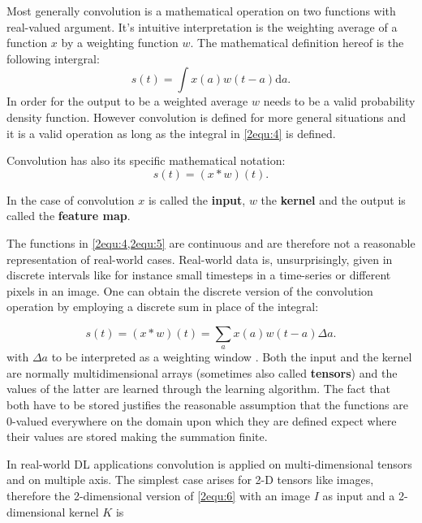 Most generally convolution is a mathematical operation on two functions with real-valued argument. It's intuitive interpretation is the weighting average of a function $x$ by a weighting function $w$.
The mathematical definition hereof is the following intergral:
\begin{equation}
    s(t) = \int x(a)w(t-a) \text{d}a \text{.}
\label{2equ:4}
\end{equation}
In order for the output to be a weighted average $w$ needs to be a valid probability density function. However convolution is defined for more general situations and it is a valid operation as long as the integral in \cref{2equ:4} is defined.

Convolution has also its specific mathematical notation:
\begin{equation}
    s(t) = (x \ast w) (t) \text{.}
\label{2equ:5}
\end{equation}

In the case of convolution $x$ is called the \textbf{input}, $w$ the \textbf{kernel} and the output is called the \textbf{feature map}.

The functions in \cref{2equ:4,2equ:5} are continuous and are therefore not a reasonable representation of real-world cases. Real-world data is, unsurprisingly, given in discrete intervals like for instance small timesteps in a time-series or different pixels in an image. One can obtain the discrete version of the convolution operation by employing a discrete sum in place of the integral:

\begin{equation}
    s(t) = (x \ast w) (t) = \sum_{a} x(a) w(t-a) \Delta a \text{.}
\label{2equ:6}
\end{equation}
with $\Delta a$ to be interpreted as a weighting window \citep{Goodfellow2016,Bishop2006PatternLearning}. Both the input and the kernel are normally multidimensional arrays (sometimes also called \textbf{tensors}) and the values of the latter are learned through the learning algorithm. The fact that both have to be stored justifies the reasonable assumption that the functions are 0-valued everywhere on the domain upon which they are defined expect where their values are stored \citep{Goodfellow2016} making the summation finite. 

In real-world DL applications convolution is applied on multi-dimensional tensors and on multiple axis. The simplest case arises for 2-D tensors like images, therefore the 2-dimensional version of \cref{2equ:6} with an image $I$ as input and a 2-dimensional kernel $K$ is

